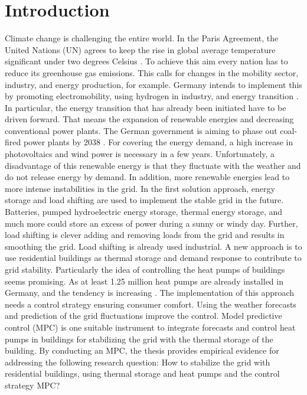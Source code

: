 \chapter{Introduction}
\label{ch:introduction}
Climate change is challenging the entire world. In the Paris Agreement, the United Nations (UN) agrees to keep the rise in global average temperature significant under two degrees Celsius \cite{UnitedNations.2015}. To achieve this aim every nation has to reduce its greenhouse gas emissions. This calls for changes in the mobility sector, industry, and energy production, for example. Germany intends to implement this by promoting electromobility, using hydrogen in industry, and energy transition \cite{Deutschlandfunk.24.06.2021}. In particular, the energy transition that has already been initiated have to be driven forward. That means the expansion of renewable energies and decreasing conventional power plants. The German government is aiming to phase out coal-fired power plants by 2038 \cite{bundesregierung.2021}. For covering the energy demand, a high increase in photovoltaics and wind power is necessary in a few years. 
\newline
Unfortunately, a disadvantage of this renewable energy is that they fluctuate with the weather and do not release energy by demand. In addition, more renewable energies lead to more intense instabilities in the grid. In the first solution approach, energy storage and load shifting are used to implement the stable grid in the future. Batteries, pumped hydroelectric energy storage, thermal energy storage, and much more could store an excess of power during a sunny or windy day. Further, load shifting is clever adding and removing loads from the grid and results in smoothing the grid. Load shifting is already used industrial. A new approach is to use residential buildings as thermal storage and demand response to contribute to grid stability. Particularly the idea of controlling the heat pumps of buildings seems promising. As at least 1.25 million heat pumps are already installed in Germany, and the tendency is increasing \cite{BMW.2021}.
\newline
The implementation of this approach needs a control strategy ensuring consumer comfort. Using the weather forecasts and prediction of the grid fluctuations improve the control. Model predictive control (MPC) is one suitable instrument to integrate forecasts and control heat pumps in buildings for stabilizing the grid with the thermal storage of the building. By conducting an MPC, the thesis provides empirical evidence for addressing the following research question: How to stabilize the grid with residential buildings, using thermal storage and heat pumps and the control strategy MPC?


